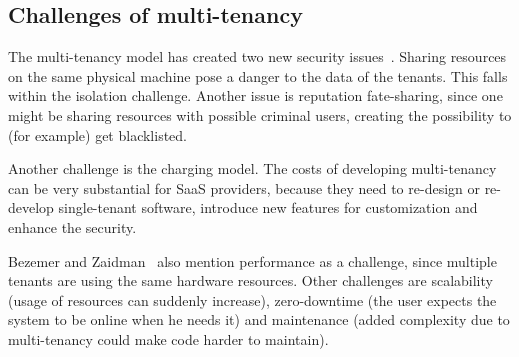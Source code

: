 \subsection{Challenges of multi-tenancy}

The multi-tenancy model has created two new security issues~\cite{dillon2010cloud}. Sharing resources on the same physical machine pose a danger to the data of the tenants. This falls within the isolation challenge. Another issue is reputation fate-sharing, since one might be sharing resources with possible criminal users, creating the possibility to (for example) get blacklisted.

Another challenge is the charging model. The costs of developing multi-tenancy can be very substantial for \ac{SaaS} providers, because they need to re-design or re-develop single-tenant software, introduce new features for customization and enhance the security.

Bezemer and Zaidman~\cite{bezemer2010multi} also mention performance as a challenge, since multiple tenants are using the same hardware resources. Other challenges are scalability (usage of resources can suddenly increase), zero-downtime (the user expects the system to be online when he needs it) and maintenance (added complexity due to multi-tenancy could make code harder to maintain).